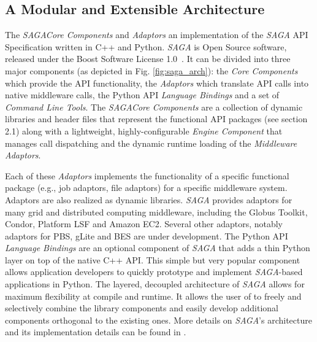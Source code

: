 \documentclass[a4paper,10pt]{article}
\newcommand{\I}[1]{\textit{#1}}
\newcommand{\sagaspec}{\textit{SAGA}\xspace}
\newcommand{\sagaimpl}{\textit{SAGA}\xspace}
\newcommand{\spec}{\sagaspec}
\newcommand{\impl}{\sagaimpl}
\begin{document}
\subsection*{A Modular and Extensible Architecture}

The \impl \I{Core Components} and \I{Adaptors} an implementation
of the \spec API Specification written in C++ and Python. \impl is
Open Source software, released under the Boost Software
License 1.0~\cite{boost_license_web}. It can be divided into
three major components (as depicted in Fig. \ref{fig:saga_arch}):
the \I{Core Components} which provide the API functionality, the
\I{Adaptors} which translate API calls into native middleware calls,
the Python API \I{Language Bindings} and a set of \I{Command Line
  Tools}. The \impl \I{Core Components} are a collection of dynamic
libraries and header files that represent the functional API packages
(see section 2.1) along with a lightweight, highly-configurable
\I{Engine Component} that manages call dispatching and the dynamic
runtime loading of the \I{Middleware Adaptors}.


Each of these \I{Adaptors} implements the functionality of a specific
functional package (e.g., job adaptors, file adaptors) for a specific
middleware system. Adaptors are also realized as dynamic
libraries. \impl provides adaptors for many grid and distributed
computing middleware, including the Globus Toolkit, Condor, Platform
LSF and Amazon EC2. Several other adaptors, notably adaptors for PBS,
gLite and BES are under development. The Python API \I{Language
  Bindings} are an optional component of \impl that adds a thin Python
layer on top of the native C++ API. This simple but very popular
component allows application developers to quickly prototype and
implement \impl-based applications in Python.  The layered, decoupled
architecture of \impl allows for maximum flexibility at compile and
runtime. It allows the user of to freely and selectively combine the
library components and easily develop additional components orthogonal
to the existing ones. More details on \impl's architecture and its
implementation details can be found in \cite{OOPSLA_PAPER}.

\end{document}
